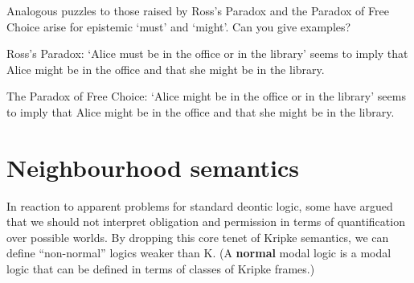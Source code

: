
\begin{exercise}
  Analogous puzzles to those raised by Ross's Paradox and the Paradox of Free
  Choice arise for epistemic `must' and `might'. Can you give examples?
\end{exercise}
\begin{solution}
  Ross's Paradox: `Alice must be in the office or in the library'
  seems to imply that Alice might be in the office and that she might
  be in the library.

  The Paradox of Free Choice: `Alice might be in the office or in the
  library' seems to imply that Alice might be in the office and that
  she might be in the library.
\end{solution}


\section{Neighbourhood semantics}\label{sec:neighbourhood}

In reaction to apparent problems for standard deontic logic, some have argued
that we should not interpret obligation and permission in terms of
quantification over possible worlds. By dropping this core tenet of Kripke
semantics, we can define ``non-normal'' logics weaker than K. (A \textbf{normal}
modal logic is a modal logic that can be defined in terms of classes of Kripke
frames.)

